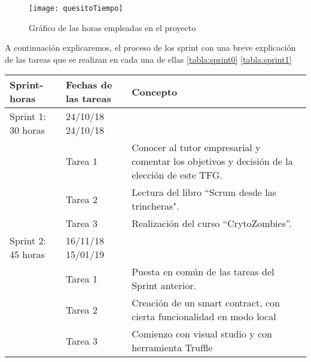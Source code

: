 \begin{figure}
    \centering
    \texttt{[image: quesitoTiempo]}
    \caption{Gráfico de las horas empleadas en el proyecto}
    \label{ref:horas}
\end{figure}
 
A continuación explicaremos, el proceso de los sprint con una breve explicación de las tareas que se realizan en cada una de ellas \ref{tabla:sprint0} \ref{tabla:sprint1} 

\begin{table}[H]
\begin{tabular}{|p{1.5cm}|p{1.5cm}|p{5cm}}
\hline
\textbf{Sprint- horas} &  \textbf{Fechas de las tareas} & \multicolumn{1}{l|}{\textbf{Concepto}}                                                                                    \\ \hline
Sprint 1: 30 horas       & 24/10/18 24/10/18           &                                                                                                                   \\ \hline
               & Tarea 1             & \multicolumn{1}{p{9.2cm}|}{Conocer al tutor empresarial y comentar los objetivos y decisión de la elección de este TFG.} \\ \hline
                         & Tarea 2                       & \multicolumn{1}{p{9.2cm}|}{Lectura del libro “Scrum desde las trincheras".}                                              \\ \hline
                         & Tarea 3                       & \multicolumn{1}{p{9.2cm}|}{Realización del curso “CrytoZombies”.}                                                        \\ \hline
Sprint 2: 45 horas       & 16/11/18 15/01/19           & \multicolumn{1}{p{9.2cm}|}{}                                                                                             \\ \hline
                         & Tarea 1                       & \multicolumn{1}{p{9.2cm}|}{Puesta en común de las tareas del Sprint anterior.}                                  \\ \hline
                         & Tarea 2                       & \multicolumn{1}{p{9.2cm}|}{Creación de un smart contract, con cierta funcionalidad en modo local}               \\ \hline
                         & Tarea 3                       & \multicolumn{1}{p{9.2cm}|}{Comienzo con visual studio y con herramienta Truffle}                                \\ \hline 


\end{tabular}
\end{table}
